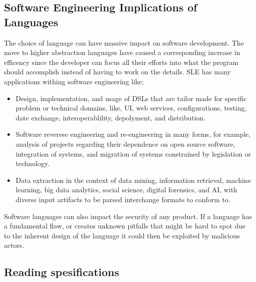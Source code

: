 \documentclass{article}
\begin{document}
        \subsection{Software Engineering Implications of Languages}
        The choice of language can have massive impact on software development. The move to higher abstraction languages have caused a corresponding increase in efficency
        since the developer can focus all their efforts into what the program should accomplish instead of having to work on the details. 
       \gls{SLE} has many applications withing software engineering like;
        \begin{itemize}
            \item Design, implementation, and usage of DSLs that are tailor made for specific problem or technical domains, like, UI, web services, configurations, testing,
                    date exchange, interoperablility, depolyment, and distribution.
            \item Software reverese engineering and re-engineering in many forms, for example, analysis of projects regarding their dependence on open source software,
                    integration of systems, and migration of systems constrained by legislation or technology.
            \item Data extraction in the context of data mining, information retrieval, machine learning, big data analytics, social science, digital forensics, and AI, 
                    with diverse input artifacts to be parsed interchange formats to conform to.
        \end{itemize}
        Software languages can also impact the security of any product. If a language has a fundamental flaw, or creates unknown pitfalls that might be hard to spot due to
        the inherent design of the language it could then be exploited by malicious actors. 
        \subsection{Reading spesifications}
\end{document}
